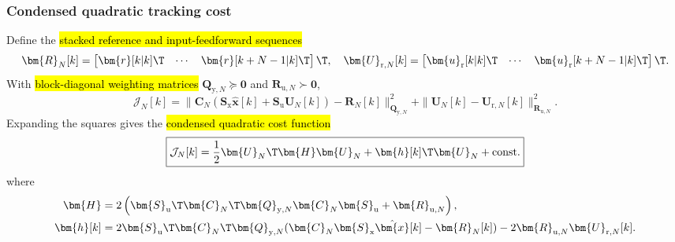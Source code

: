 \begin{frame}
	\frametitle{Condensed quadratic tracking cost}
	Define the \hl{stacked reference and input-feedforward sequences}
	\begin{equation}
		\bm{R}_{N}[k]=\begin{bmatrix}\bm{r}[k|k]\T&\cdots&\bm{r}[k+N-1|k]\T\end{bmatrix}\T,
		\quad
		\bm{U}_{\mathrm{r},N}[k]=\begin{bmatrix}\bm{u}_{\mathrm{r}}[k|k]\T&\cdots&\bm{u}_{\mathrm{r}}[k+N-1|k]\T\end{bmatrix}\T.
	\end{equation}\pause%
	With \hl{block-diagonal weighting matrices} $\bm{Q}_{\mathrm{y},N}\succeq\bm{0}$ and $\bm{R}_{\mathrm{u},N}\succ\bm{0}$,
	\begin{equation}
		\mathcal{J}_{N}[k]
		=\|\bm{C}_{N}(\bm{S}_{\mathrm{x}}\hat{\bm{x}}[k]+\bm{S}_{\mathrm{u}}\bm{U}_{N}[k])-\bm{R}_{N}[k]\|_{\bm{Q}_{\mathrm{y},N}}^{2}
		+\|\bm{U}_{N}[k]-\bm{U}_{\mathrm{r},N}[k]\|_{\bm{R}_{\mathrm{u},N}}^{2}.
	\end{equation}\pause%
	Expanding the squares gives the \hl{condensed quadratic cost function}
	\begin{equation}
		\boxed{\mathcal{J}_{N}[k]=\frac{1}{2}\bm{U}_{N}\T\bm{H}\bm{U}_{N}
			+\bm{h}[k]\T\bm{U}_{N}+\mathrm{const.}}
	\end{equation}\pause%
	where
	\begin{align}
		\bm{H}    & =2\left(\bm{S}_{\mathrm{u}}\T\bm{C}_{N}\T\bm{Q}_{\mathrm{y},N}\bm{C}_{N}\bm{S}_{\mathrm{u}}+\bm{R}_{\mathrm{u},N}\right),                                            \\
		\bm{h}[k] & =2\bm{S}_{\mathrm{u}}\T\bm{C}_{N}\T\bm{Q}_{\mathrm{y},N}(\bm{C}_{N}\bm{S}_{\mathrm{x}}\hat{\bm{x}}[k]-\bm{R}_{N}[k])-2\bm{R}_{\mathrm{u},N}\bm{U}_{\mathrm{r},N}[k].
	\end{align}
\end{frame}

